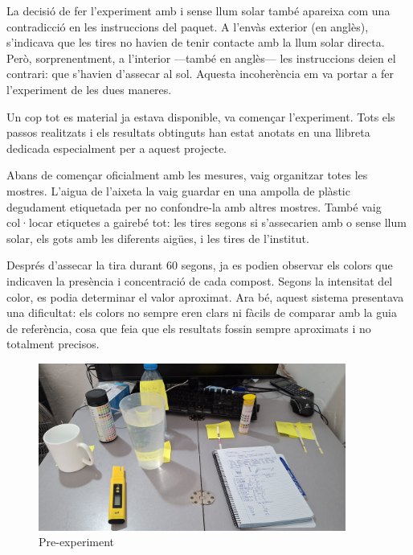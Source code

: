 La decisió de fer l'experiment amb i sense llum solar també apareixa com una contradicció en les instruccions del paquet. A l’envàs exterior (en anglès), s’indicava que les tires no havien de tenir contacte amb la llum solar directa. Però, sorprenentment, a l’interior —també en anglès— les instruccions deien el contrari: que s’havien d’assecar al sol. Aquesta incoherència em va portar a fer l’experiment de les dues maneres.


Un cop tot es material ja estava disponible, va començar l'experiment. Tots els passos realitzats i els resultats obtinguts han estat anotats en una llibreta dedicada especialment per a aquest projecte.


Abans de començar oficialment amb les mesures, vaig organitzar totes les mostres. L’aigua de l’aixeta la vaig guardar en una ampolla de plàstic degudament etiquetada per no confondre-la amb altres mostres. També vaig col·locar etiquetes a gairebé tot: les tires segons si s’assecarien amb o sense llum solar, els gots amb les diferents aigües, i les tires de l’institut.


Després d’assecar la tira durant 60 segons, ja es podien observar els colors que indicaven la presència i concentració de cada compost. Segons la intensitat del color, es podia determinar el valor aproximat. Ara bé, aquest sistema presentava una dificultat: els colors no sempre eren clars ni fàcils de comparar amb la guia de referència, cosa que feia que els resultats fossin sempre aproximats i no totalment precisos.



\begin{figure}[h!]
\centering
\includegraphics[width=0.9\textwidth, angle=0]{./Figures/expe.png}
\caption{Pre-experiment }
\label{fig:fotoPreExperiment}
\end{figure}

